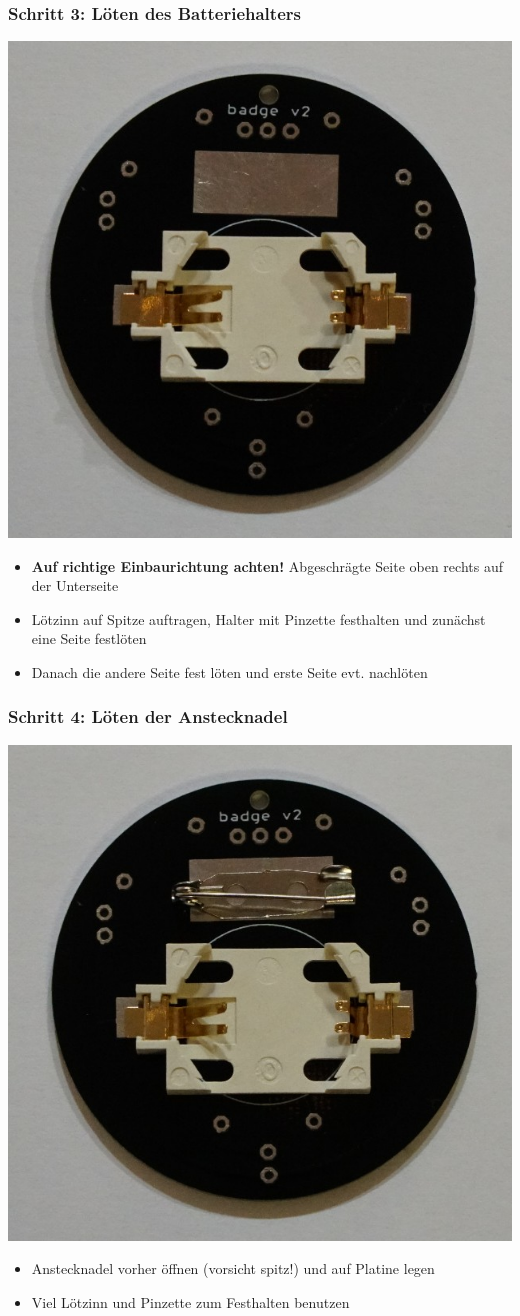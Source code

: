 \documentclass[10pt]{beamer}
\begin{document}
	\begin{frame}
		\frametitle{Schritt 3: Löten des Batteriehalters}
		\centering \includegraphics[width=.4\linewidth]{images/step3.png}
		\begin{itemize}
			\item \textbf{Auf richtige Einbaurichtung achten!} Abgeschrägte Seite oben rechts auf der Unterseite
			\item Lötzinn auf Spitze auftragen, Halter mit Pinzette festhalten und zunächst eine Seite festlöten
			\item Danach die andere Seite fest löten und erste Seite evt. nachlöten
		\end{itemize}
	\end{frame}

	\begin{frame}
		\frametitle{Schritt 4: Löten der Anstecknadel}
		\centering \includegraphics[width=.4\linewidth]{images/step4.png}
		\begin{itemize} 
			\item{Anstecknadel vorher öffnen (vorsicht spitz!) und auf Platine legen}
			\item{Viel Lötzinn und Pinzette zum Festhalten benutzen}
		\end{itemize}
	\end{frame}
\end{document}
